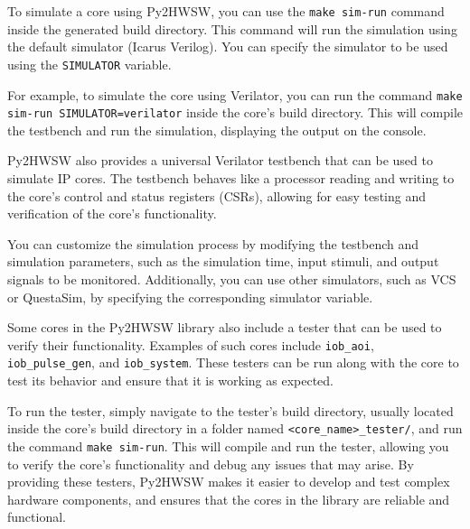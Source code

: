 %

To simulate a core using Py2HWSW, you can use the \texttt{make sim-run} command inside the generated build directory. This command will run the simulation using the default simulator (Icarus Verilog).
You can specify the simulator to be used using the \texttt{SIMULATOR} variable.

For example, to simulate the core using Verilator, you can run the command \texttt{make sim-run SIMULATOR=verilator} inside the core's build directory. This will compile the testbench and run the simulation, displaying the output on the console.

Py2HWSW also provides a universal Verilator testbench that can be used to simulate IP cores. The testbench behaves like a processor reading and writing to the core's control and status registers (CSRs), allowing for easy testing and verification of the core's functionality.

You can customize the simulation process by modifying the testbench and simulation parameters, such as the simulation time, input stimuli, and output signals to be monitored. Additionally, you can use other simulators, such as VCS or QuestaSim, by specifying the corresponding simulator variable.

Some cores in the Py2HWSW library also include a tester that can be used to verify their functionality. Examples of such cores include \texttt{iob\_aoi}, \texttt{iob\_pulse\_gen}, and \texttt{iob\_system}. These testers can be run along with the core to test its behavior and ensure that it is working as expected.

To run the tester, simply navigate to the tester's build directory, usually located inside the core's build directory in a folder named \texttt{<core\_name>\_tester/}, and run the command \texttt{make sim-run}.
This will compile and run the tester, allowing you to verify the core's functionality and debug any issues that may arise.
By providing these testers, Py2HWSW makes it easier to develop and test complex hardware components, and ensures that the cores in the library are reliable and functional.

